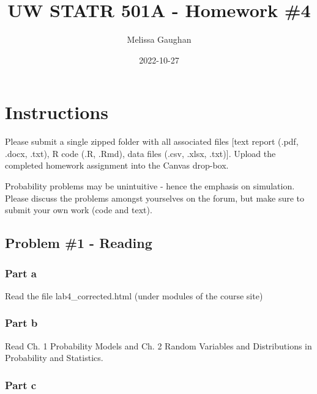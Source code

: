 \documentclass[
  letterpaper,
  DIV=11,
  numbers=noendperiod]{scrartcl}
\title{UW STATR 501A - Homework \#4}
\author{Melissa Gaughan}
\date{2022-10-27}
\renewcommand*\contentsname{Table of contents}
\newcommand\contentsname{Table of contents}
\begin{document}
\maketitle
\ifdefined\Shaded\renewenvironment{Shaded}{\begin{tcolorbox}[breakable, interior hidden, enhanced, boxrule=0pt, frame hidden, borderline west={3pt}{0pt}{shadecolor}, sharp corners]}{\end{tcolorbox}}\fi

\renewcommand*\contentsname{Table of contents}
{
\hypersetup{linkcolor=}
\setcounter{tocdepth}{3}
\tableofcontents
}
\hypertarget{instructions}{%
\section{Instructions}\label{instructions}}

Please submit a single zipped folder with all associated files {[}text
report (.pdf, .docx, .txt), R code (.R, .Rmd), data files (.csv, .xlsx,
.txt){]}. Upload the completed homework assignment into the Canvas
drop-box.

Probability problems may be unintuitive - hence the emphasis on
simulation. Please discuss the problems amongst yourselves on the forum,
but make sure to submit your own work (code and text).

\hypertarget{problem-1---reading}{%
\subsection{Problem \#1 - Reading}\label{problem-1---reading}}

\hypertarget{part-a}{%
\subsubsection{Part a}\label{part-a}}

Read the file lab4\_corrected.html (under modules of the course site)

\hypertarget{part-b}{%
\subsubsection{Part b}\label{part-b}}

Read Ch. 1 Probability Models and Ch. 2 Random Variables and
Distributions in Probability and Statistics.

\hypertarget{part-c}{%
\subsubsection{Part c}\label{part-c}}
\end{document}
